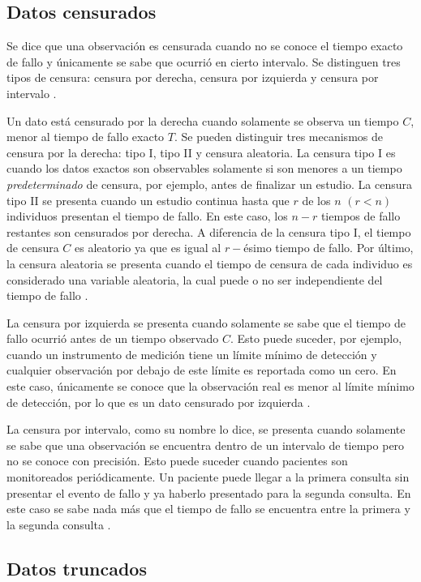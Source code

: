 \documentclass[11pt,a4paper]{article}
\begin{document}
\subsection{Datos censurados}

Se dice que una observación es censurada cuando no se conoce el tiempo exacto de fallo y únicamente se sabe que ocurrió en cierto intervalo. Se distinguen tres tipos de censura: censura por derecha, censura por izquierda y censura por intervalo \citep{klein}.

Un dato está censurado por la derecha cuando solamente se observa un tiempo $C$, menor al tiempo de fallo exacto $T$. Se pueden distinguir tres mecanismos de censura por la derecha: tipo I, tipo II y censura aleatoria. La censura tipo I es cuando los datos exactos son observables solamente si son menores a un tiempo \textit{predeterminado} de censura, por ejemplo, antes de finalizar un estudio. La censura tipo II se presenta cuando un estudio continua hasta que $r$ de los $n$ $(r<n)$ individuos presentan el tiempo de fallo. En este caso, los $n-r$ tiempos de fallo restantes son censurados por derecha. A diferencia de la censura tipo I, el tiempo de censura $C$ es aleatorio ya que es igual al $r-$ésimo tiempo de fallo. Por último, la censura aleatoria se presenta cuando el tiempo de censura de cada individuo es considerado una variable aleatoria, la cual puede o no ser independiente del tiempo de fallo \citep{klein}.

La censura por izquierda se presenta cuando solamente se sabe que el tiempo de fallo ocurrió antes de un tiempo observado $C$. Esto puede suceder, por ejemplo, cuando un instrumento de medición tiene un límite mínimo de detección y cualquier observación por debajo de este límite es reportada como un cero. En este caso, únicamente se conoce que la observación real es menor al límite mínimo de detección, por lo que es un dato censurado por izquierda \citep{klein}.

La censura por intervalo, como su nombre lo dice, se presenta cuando solamente se sabe que una observación se encuentra dentro de un intervalo de tiempo pero no se conoce con precisión. Esto puede suceder cuando pacientes son monitoreados periódicamente. Un paciente puede llegar a la primera consulta sin presentar el evento de fallo y ya haberlo presentado para la segunda consulta. En este caso se sabe nada más que el tiempo de fallo se encuentra entre la primera y la segunda consulta \citep{klein}. 

\subsection{Datos truncados}
\label{sec:truncados}
\end{document}
